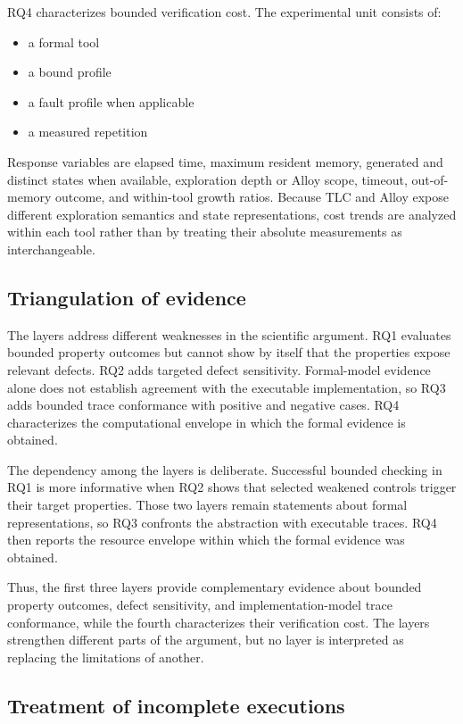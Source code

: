 RQ4 characterizes bounded verification cost. The experimental unit consists of:

\begin{itemize}
\item a formal tool
\item a bound profile
\item a fault profile when applicable
\item a measured repetition
\end{itemize}

Response variables are elapsed time, maximum resident memory, generated and
distinct states when available, exploration depth or Alloy scope, timeout,
out-of-memory outcome, and within-tool growth ratios. Because TLC and Alloy
expose different exploration semantics and state representations, cost trends
are analyzed within each tool rather than by treating their absolute
measurements as interchangeable.

\subsection{Triangulation of evidence}
\label{subsec:evidence-triangulation}

The layers address different weaknesses in the scientific argument. RQ1
evaluates bounded property outcomes but cannot show by itself that the
properties expose relevant defects. RQ2 adds targeted defect sensitivity.
Formal-model evidence alone does not establish agreement with the executable
implementation, so RQ3 adds bounded trace conformance with positive and
negative cases. RQ4 characterizes the computational envelope in which the
formal evidence is obtained.

The dependency among the layers is deliberate. Successful bounded checking in
RQ1 is more informative when RQ2 shows that selected weakened controls trigger
their target properties. Those two layers remain statements about formal
representations, so RQ3 confronts the abstraction with executable traces. RQ4
then reports the resource envelope within which the formal evidence was
obtained.

Thus, the first three layers provide complementary evidence about bounded
property outcomes, defect sensitivity, and implementation-model trace
conformance, while the fourth characterizes their verification cost. The layers
strengthen different parts of the argument, but no layer is interpreted as
replacing the limitations of another.

\subsection{Treatment of incomplete executions}
\label{subsec:incomplete-executions}

